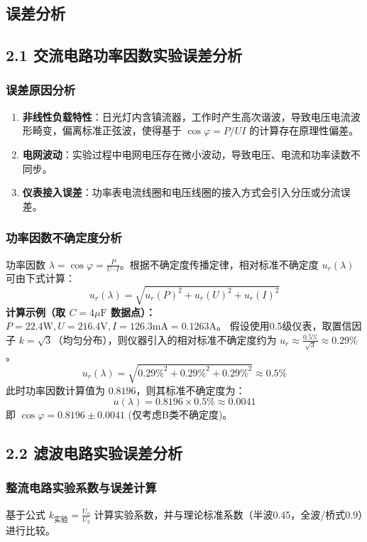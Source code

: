 \documentclass[]{../template/Report}%
\begin{document}
\begin{fullreportonly}
\section{误差分析}

\subsection{2.1 交流电路功率因数实验误差分析}

\subsubsection{误差原因分析}
\begin{enumerate}
    \item \textbf{非线性负载特性}：日光灯内含镇流器，工作时产生高次谐波，导致电压电流波形畸变，偏离标准正弦波，使得基于 $\cos\varphi = P/UI$ 的计算存在原理性偏差。
    \item \textbf{电网波动}：实验过程中电网电压存在微小波动，导致电压、电流和功率读数不同步。
    \item \textbf{仪表接入误差}：功率表电流线圈和电压线圈的接入方式会引入分压或分流误差。
\end{enumerate}

\subsubsection{功率因数不确定度分析}
功率因数 $\lambda = \cos\varphi = \frac{P}{U \cdot I}$。根据不确定度传播定律，相对标准不确定度 $u_r(\lambda)$ 可由下式计算：
$$ u_r(\lambda) = \sqrt{u_r(P)^2 + u_r(U)^2 + u_r(I)^2} $$
\textbf{计算示例（取 $C=4\mu\text{F}$ 数据点）：}
$P=22.4\text{W}, U=216.4\text{V}, I=126.3\text{mA}=0.1263\text{A}$。
假设使用0.5级仪表，取置信因子 $k=\sqrt{3}$（均匀分布），则仪器引入的相对标准不确定度约为 $u_r \approx \frac{0.5\%}{\sqrt{3}} \approx 0.29\%$。
$$ u_r(\lambda) = \sqrt{0.29\%^2 + 0.29\%^2 + 0.29\%^2} \approx 0.5\% $$
此时功率因数计算值为 $0.8196$，则其标准不确定度为：
$$ u(\lambda) = 0.8196 \times 0.5\% \approx 0.0041 $$
即 $\cos\varphi = 0.8196 \pm 0.0041$ (仅考虑B类不确定度)。

\subsection{2.2 滤波电路实验误差分析}

\subsubsection{整流电路实验系数与误差计算}
基于公式 $k_{\text{实验}} = \frac{U_o}{U_2}$ 计算实验系数，并与理论标准系数（半波0.45，全波/桥式0.9）进行比较。


\end{fullreportonly}
\end{document}
